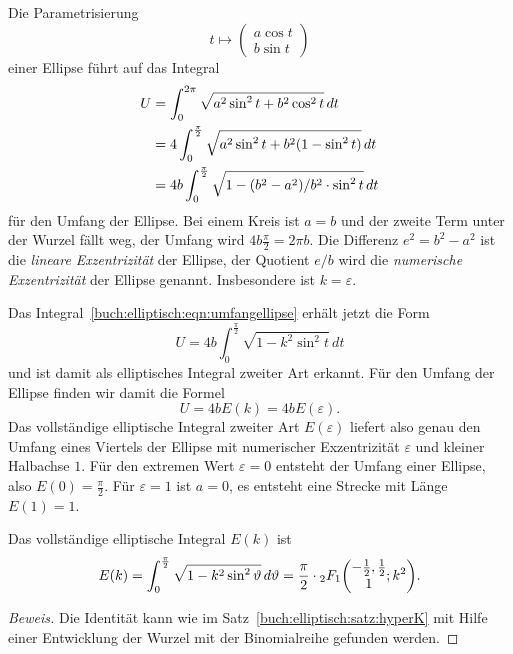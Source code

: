 Die Parametrisierung
\[
t\mapsto \begin{pmatrix}a\cos t\\ b\sin t\end{pmatrix}
\]
einer Ellipse führt auf das Integral
\begin{align}
U
&=
\int_0^{2\pi} \sqrt{a^2\sin^2t + b^2\cos^2 t}\,dt
\notag
\\
&=
4\int_0^{\frac{\pi}2}
\sqrt{a^2\sin^2t + b^2(1-\sin^2 t)}
\,dt
\notag
\\
&=
4b \int_0^{\frac{\pi}2} \sqrt{1-(b^2-a^2)/b^2\cdot \sin^2t}\,dt
\label{buch:elliptisch:eqn:umfangellipse}
\end{align}
für den Umfang der Ellipse.
Bei einem Kreis ist $a=b$ und der zweite Term unter der Wurzel fällt weg,
der Umfang wird $4b\frac{\pi}2=2\pi b$.
Die Differenz $e^2=b^2-a^2$ ist die {\em lineare Exzentrizität} der Ellipse,
%
der Quotient $e/b$ wird die {\em numerische Exzentrizität} der Ellipse
genannt.
Insbesondere ist $k = \varepsilon$.

Das Integral~\eqref{buch:elliptisch:eqn:umfangellipse} erhält jetzt die
Form
\[
U
=
4b\int_0^{\frac{\pi}2} \sqrt{1-k^2\sin^2t}\,dt
\]
und ist damit als elliptisches Integral zweiter Art erkannt.
Für den Umfang der Ellipse finden wir damit die Formel
\[
U
=
4b E(k)
=
4b E(\varepsilon).
\]
Das vollständige elliptische Integral zweiter Art $E(\varepsilon)$
liefert also genau den Umfang eines Viertels der Ellipse mit
numerischer Exzentrizität $\varepsilon$ und kleiner Halbachse $1$.
Für den extremen Wert $\varepsilon=0$ entsteht der Umfang einer Ellipse,
also $E(0)=\frac{\pi}2$.
Für $\varepsilon=1$ ist $a=0$, es entsteht eine Strecke mit Länge $E(1)=1$.

\begin{satz}
\label{buch:elliptisch:satz:hyperE}
Das vollständige elliptische Integral $E(k)$ ist
\[
E(k)
=
\int_0^{\frac{\pi}2} \sqrt{1-k^2\sin^2\vartheta}\,d\vartheta
=
\frac{\pi}2
\cdot
\mathstrut_2F_1\biggl(
\begin{matrix}-\frac12,\frac12\\1\end{matrix};
k^2
\biggr).
\]
\end{satz}

\begin{proof}[Beweis]
Die Identität kann wie im Satz~\ref{buch:elliptisch:satz:hyperK} mit
Hilfe einer Entwicklung der Wurzel mit der Binomialreihe gefunden
werden.
\end{proof}

